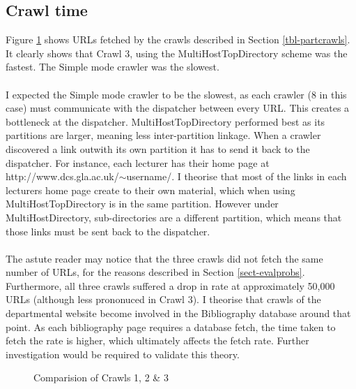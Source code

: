 \subsection{Crawl time}
Figure \ref{fig-crawlgraphs} shows URLs fetched by the crawls described in Section \ref{tbl-partcrawls}. It clearly shows that Crawl 3, using the MultiHostTopDirectory scheme was the fastest. The Simple mode crawler was the slowest.\\
\ \\
I expected the Simple mode crawler to be the slowest, as each crawler (8 in this case) must communicate with the dispatcher between every URL. This creates a bottleneck at the dispatcher. MultiHostTopDirectory performed best as its partitions are larger, meaning less inter-partition linkage. When a crawler discovered a link outwith its own partition it has to send it back to the dispatcher. For instance, each lecturer has their home page at http://www.dcs.gla.ac.uk/$\sim$username/. I theorise that most of the links in each lecturers home page create to their own material, which when using MultiHostTopDirectory is in the same partition. However under MultiHostDirectory, sub-directories are a different partition, which means that those links must be sent back to the dispatcher.\\
\ \\
The astute reader may notice that the three crawls did not fetch the same number of URLs, for the reasons described in Section \ref{sect-evalprobs}. Furthermore, all three crawls suffered a drop in rate at approximately 50,000 URLs (although less prononuced in Crawl 3). I theorise that crawls of the departmental website become involved in the Bibliography database around that point. As each bibliography page requires a database fetch, the time taken to fetch the rate is higher, which ultimately affects the fetch rate. Further investigation would be required to validate this theory.
\begin{figure}[h]
  \centerline{
   }
\caption{Comparision of Crawls 1, 2 \& 3}\label{fig-crawlgraphs}
\end{figure}
